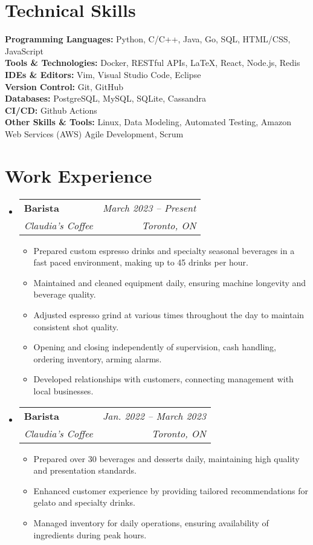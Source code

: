 \documentclass[letterpaper,11pt]{article}
\makeatletter
\newcommand{\resumeItem}[1]{
  \item\small{
    {#1 \vspace{-2pt}}
  }
}
\newcommand{\resumeSubheading}[4]{
  \vspace{-2pt}\item
    \begin{tabular*}{0.97\textwidth}[t]{l@{\extracolsep{\fill}}r}
      \textbf{#1} & #2 \\
      \textit{\small#3} & \textit{\small #4} \\
    \end{tabular*}\vspace{-7pt}
}
\newcommand{\resumeSubHeadingListStart}{\begin{itemize}[leftmargin=0.15in, label={}]}
\newcommand{\resumeSubHeadingListEnd}{\end{itemize}}
\newcommand{\resumeItemListStart}{\begin{itemize}}
\newcommand{\resumeItemListEnd}{\end{itemize}\vspace{-5pt}}
\makeatother
\begin{document}
\section{Technical Skills}
 \begin{itemize}[leftmargin=0.15in, label={}]
    \small{\item{
	\textbf{Programming Languages:} Python, C/C++, Java, Go, SQL, HTML/CSS, JavaScript \\
	\textbf{Tools \& Technologies:} Docker, RESTful APIs, LaTeX, React, Node.js, Redis \\
	\textbf{IDEs \& Editors:} Vim, Visual Studio Code, Eclipse \\
	\textbf{Version Control:} Git, GitHub \\
	\textbf{Databases:} PostgreSQL, MySQL, SQLite, Cassandra \\
	\textbf{CI/CD:} Github Actions \\
	\textbf{Other Skills \& Tools:} Linux, Data Modeling, Automated Testing, Amazon Web Services (AWS) Agile Development, Scrum
    }}
 \end{itemize}


\section{Work Experience}
  \resumeSubHeadingListStart

    \resumeSubheading
    {Barista}{\emph{March 2023 -- Present}}
      {Claudia's Coffee}{Toronto, ON}
      \resumeItemListStart
        \resumeItem{Prepared custom espresso drinks and specialty seasonal beverages in a fast paced environment, making up to 45 drinks per hour.}
	\resumeItem{Maintained and cleaned equipment daily, ensuring machine longevity and beverage quality.}
	\resumeItem{Adjusted espresso grind at various times throughout the day to maintain consistent shot quality.}
	\resumeItem{Opening and closing independently of supervision, cash handling, ordering inventory, arming alarms.}
	\resumeItem{Developed relationships with customers, connecting management with local businesses.}
      \resumeItemListEnd

    \resumeSubheading
    {Barista}{\emph{Jan. 2022 -- March 2023}}
      {Claudia's Coffee}{Toronto, ON}
      \resumeItemListStart
      \resumeItem{Prepared over 30 beverages and desserts daily, maintaining high quality and presentation standards.}
      \resumeItem{Enhanced customer experience by providing tailored recommendations for gelato and specialty drinks.}
      \resumeItem{Managed inventory for daily operations, ensuring availability of ingredients during peak hours.}
      \resumeItemListEnd
  \resumeSubHeadingListEnd


\end{document}
